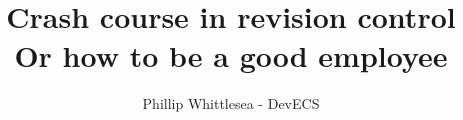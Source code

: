 \documentclass{beamer}
\title[Using Git like a baus]{Crash course in revision control\\Or how to be a good employee}
\author{Phillip Whittlesea - DevECS}
\institute{Electronics and Computer Science}
\begin{document}
\begin{frame}
    \titlepage
\end{frame}

















\end{document}
